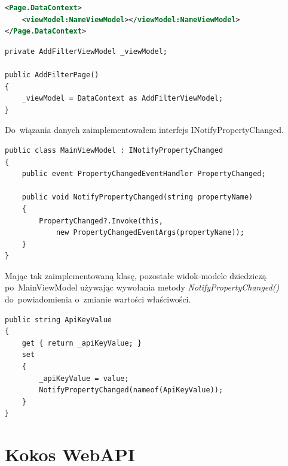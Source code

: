 \documentclass[a4paper,twoside,titlepage,openright]{book}
\begin{document}
\noindent
\begin{minipage}{\linewidth}
\begin{lstlisting}[caption=Podpięcie widok-modelu do~Widoku w~pliku XAML, label=lst:test, language=xml]
<Page.DataContext>
	<viewModel:NameViewModel></viewModel:NameViewModel>
</Page.DataContext>
\end{lstlisting}
\end{minipage}


\noindent
\begin{minipage}{\linewidth}
\begin{lstlisting}[caption=Podpięcie widok-modelu w~pliku Code-Behind, label=lst:test]
private AddFilterViewModel _viewModel;

public AddFilterPage() 
{
	_viewModel = DataContext as AddFilterViewModel;
}
\end{lstlisting}
\end{minipage}


\noindent
\begin{minipage}{\linewidth}

Do~wiązania danych zaimplementowałem interfejs INotifyPropertyChanged. 

\begin{lstlisting}[caption=Implementacja interfejsu INotifyPropertyChanged w~jednej z~klas, label=lst:test]
public class MainViewModel : INotifyPropertyChanged
{
	public event PropertyChangedEventHandler PropertyChanged;
	
	public void NotifyPropertyChanged(string propertyName)
	{
		PropertyChanged?.Invoke(this,
			new PropertyChangedEventArgs(propertyName));
	}
}
\end{lstlisting}
\end{minipage}

Mając tak zaimplementowaną klasę, pozostałe widok-modele dziedziczą po~MainViewModel używając wywołania metody \textit{NotifyPropertyChanged()} do~powiadomienia o~zmianie wartości właściwości.

\noindent
\begin{lstlisting}[caption=Przykładowa właściwość wykorzystująca mechanizm NotifyPropertyChanged, label=lst:test]
public string ApiKeyValue
{
	get { return _apiKeyValue; }
	set
	{
		_apiKeyValue = value;
		NotifyPropertyChanged(nameof(ApiKeyValue));
	}
}
\end{lstlisting}

\section{Kokos WebAPI}
\end{document}
